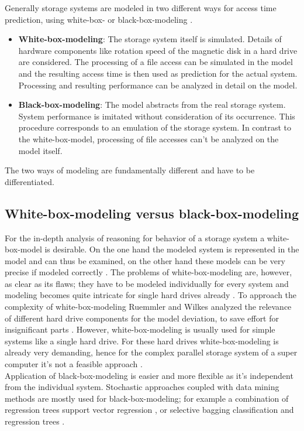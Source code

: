 \documentclass{superfri}
\begin{document}
Generally storage systems are modeled in two different ways for access time prediction, using white-box- or black-box-modeling \cite{Crume:2013:FML:2538542.2538561}.
\begin{itemize}
	\item \textbf{White-box-modeling}: The storage system itself is simulated. Details of hardware components like rotation speed of the magnetic disk in a hard drive are considered. The processing of a file access can be simulated in the model and the resulting access time is then used as prediction for the actual system.
	Processing and resulting performance can be analyzed in detail on the model.
	\item \textbf{Black-box-modeling}: The model abstracts from the real storage system. 
	System performance is imitated without consideration of its occurrence. %
	This procedure corresponds to an emulation of the storage system.
	In contrast to the white-box-model, processing of file accesses can't be analyzed on the model itself.
\end{itemize}
The two ways of modeling are fundamentally different and have to be differentiated.

\subsection{White-box-modeling versus black-box-modeling}
For the in-depth analysis of reasoning for behavior of a storage system a white-box-model is desirable.
On the one hand the modeled system is represented in the model and can thus be examined, on the other hand these models can be very precise if modeled correctly \cite{Ruemmler94anintroduction}.
The problems of white-box-modeling are, however, as clear as its flaws; they have to be modeled individually for every system and modeling becomes quite intricate for single hard drives already \cite{Crume:2013:FML:2538542.2538561}.
To approach the complexity of white-box-modeling Ruemmler and Wilkes analyzed the relevance of different hard drive components for the model deviation, to save effort for insignificant parts \cite{Ruemmler94anintroduction}.
However, white-box-modeling is usually used for simple systems like a single hard drive. For these hard drives white-box-modeling is already very demanding, hence for the complex parallel storage system of a super computer it's not a feasible approach \cite{DBLP:conf/npc/ZhangLZJC10}.\\

Application of black-box-modeling is easier and more flexible as it's independent from the individual system.
Stochastic approaches coupled with data mining methods are mostly used for black-box-modeling; for example a combination of regression trees support vector regression \cite{Dai:2012:SDP:2477169.2477214}, or selective bagging classification and regression trees \cite{DBLP:conf/npc/ZhangLZJC10}.
\end{document}
